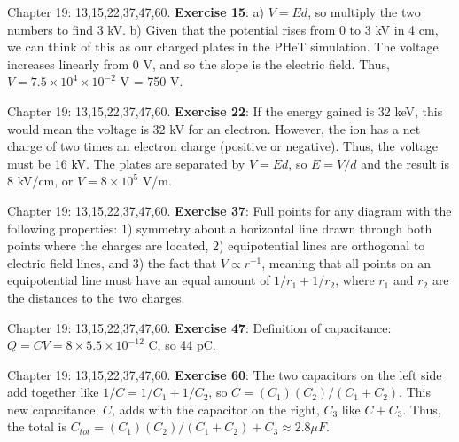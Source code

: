 \documentclass{beamer}
\begin{document}
\begin{frame}{Chapter 19: 13,15,22,37,47,60.}
\small
\textbf{Exercise 15}: a) $V = Ed$, so multiply the two numbers to find 3 kV.  b) Given that the potential rises from 0 to 3 kV in 4 cm, we can think of this as our charged plates in the PHeT simulation.  The voltage increases linearly from 0 V, and so the slope is the electric field.  Thus, $V = 7.5 \times 10^4 \times 10^{-2}$ V = 750 V.
\end{frame}

\begin{frame}{Chapter 19: 13,15,22,37,47,60.}
\small
\textbf{Exercise 22}: If the energy gained is 32 keV, this would mean the voltage is 32 kV for an electron.  However, the ion has a net charge of two times an electron charge (positive or negative).  Thus, the voltage must be 16 kV.  The plates are separated by $V = Ed$, so $E = V/d$ and the result is 8 kV/cm, or $V = 8 \times 10^5$ V/m.
\end{frame}

\begin{frame}{Chapter 19: 13,15,22,37,47,60.}
\small
\textbf{Exercise 37}: Full points for any diagram with the following properties: 1) symmetry about a horizontal line drawn through both points where the charges are located, 2) equipotential lines are orthogonal to electric field lines, and 3) the fact that $V \propto r^{-1}$, meaning that all points on an equipotential line must have an equal amount of $1/r_1 + 1/r_2$, where $r_1$ and $r_2$ are the distances to the two charges.
\end{frame}

\begin{frame}{Chapter 19: 13,15,22,37,47,60.}
\small
\textbf{Exercise 47}: Definition of capacitance: $Q = CV = 8 \times 5.5 \times 10^{-12}$ C, so 44 pC.
\end{frame}

\begin{frame}{Chapter 19: 13,15,22,37,47,60.}
\small
\textbf{Exercise 60}: The two capacitors on the left side add together like $1/C = 1/C_1 + 1/C_2$, so $C = (C_1)(C_2)/(C_1+C_2)$.  This new capacitance, $C$, adds with the capacitor on the right, $C_3$ like $C+C_3$.  Thus, the total is $C_{tot} = (C_1)(C_2)/(C_1+C_2) + C_3 \approx 2.8 \mu F$.
\end{frame}
\end{document}
